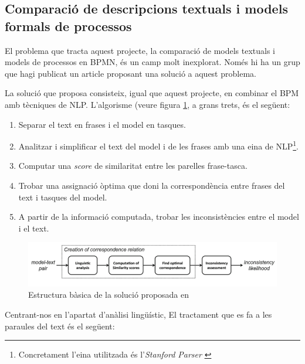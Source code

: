 \subsection{Comparació de descripcions textuals i models formals de processos}
El problema que tracta aquest projecte, la comparació de models textuals i models de processos en BPMN, és un camp molt inexplorat. Només hi ha un grup \cite{el_paper} que hagi publicat un article proposant una solució a aquest problema. 

La solució que proposa \cite{el_paper} consisteix, igual que aquest projecte, en combinar el BPM amb tècniques de NLP. L'algorisme (veure figura \ref{fig:el_paper_fig}, a grans trets, és el següent:

\begin{enumerate}
    \item Separar el text en frases i el model en tasques.
    \item Analitzar i simplificar el text del model i de les frases amb una eina de NLP\footnote{Concretament l'eina utilitzada és l'\emph{Stanford Parser} \cite{stanford_parser}}.
    \item Computar una \emph{score} de similaritat entre les parelles frase-tasca.
    \item Trobar una assignació òptima que doni la correspondència entre frases del text i tasques del model.
    \item A partir de la informació computada, trobar les inconsistències entre el model i el text.
\end{enumerate}

\begin{figure}[bth]
    \centering
    \includegraphics [width=\textwidth]{figures/el_paper_fig.png}
    \caption{Estructura bàsica de la solució proposada en \cite{el_paper}}
    \label{fig:el_paper_fig}
\end{figure}

Centrant-nos en l'apartat d'anàlisi lingüístic, El tractament que es fa a les paraules del text és el següent:

